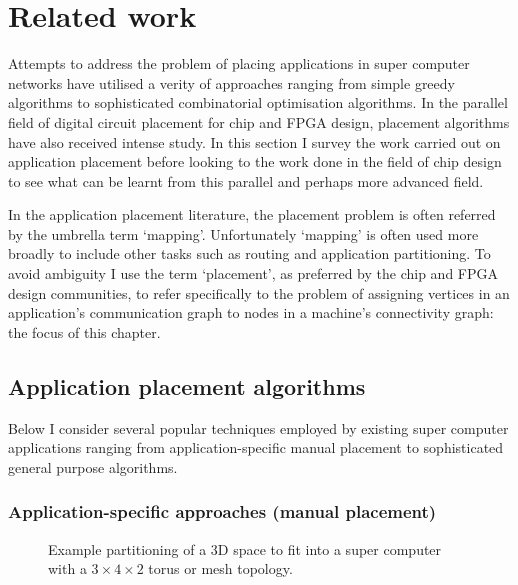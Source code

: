	\section{Related work}
		
		Attempts to address the problem of placing applications in super computer
		networks have utilised a verity of approaches ranging from simple greedy
		algorithms to sophisticated combinatorial optimisation algorithms. In the
		parallel field of digital circuit placement for chip and FPGA design,
		placement algorithms have also received intense study.  In this section I
		survey the work carried out on application placement before looking to the
		work done in the field of chip design to see what can be learnt from this
		parallel and perhaps more advanced field.
		
		In the application placement literature, the placement problem is often
		referred by the umbrella term `mapping'. Unfortunately `mapping' is often
		used more broadly to include other tasks such as routing and application
		partitioning. To avoid ambiguity I use the term `placement', as preferred
		by the chip and FPGA design communities, to refer specifically to the
		problem of assigning vertices in an application's communication graph to
		nodes in a machine's connectivity graph: the focus of this chapter.
		
		\subsection{Application placement algorithms}
			
			Below I consider several popular techniques employed by existing super
			computer applications ranging from application-specific manual placement
			to sophisticated general purpose algorithms.
			
			\subsubsection{Application-specific approaches (manual placement)}
				
				\begin{figure}
					\center
					
					\caption{Example partitioning of a 3D space to fit into a super
					computer with a $3\times4\times2$ torus or mesh topology.}
					\label{fig:fem-partitioning}
				\end{figure}
				
